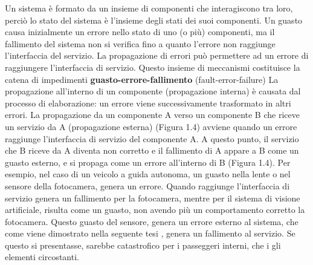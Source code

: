 \documentclass[14pt]{extarticle}
\begin{document}
Un sistema è formato da un insieme di componenti che interagiscono tra
loro, perciò lo stato del sistema è l'insieme degli stati dei suoi componenti. Un
guasto causa inizialmente un errore nello stato di uno (o più) componenti, ma
il fallimento del sistema non si verifica fino a quanto l'errore non raggiunge l'interfaccia del servizio. La propagazione di errori può permettere ad un errore
di raggiungere l'interfaccia di servizio. Questo insieme di meccanismi costituisce la catena di impedimenti \textbf{guasto-errore-fallimento} (fault-error-failure)
La propagazione all'interno di un componente (propagazione interna) è
causata dal processo di elaborazione: un errore viene successivamente trasformato in altri errori.
 La propagazione da un componente A verso un componente B che riceve un servizio da A (propagazione esterna) (Figura 1.4) avviene
quando un errore raggiunge l'interfaccia di servizio del componente A. A questo punto, il servizio che B riceve da A diventa non corretto e il fallimento di
A appare a B come un guasto esterno, e si propaga come un errore all’interno
di B (Figura 1.4). Per esempio, nel caso di un veicolo a guida autonoma, un guasto nella lente o nel sensore della fotocamera,  genera un errore. Quando raggiunge l'interfaccia di servizio genera un fallimento per la fotocamera, mentre per il sistema di visione artificiale, risulta come un guasto, non avendo più un comportamento corretto la fotocamera. Questo guasto del sensore, genera un errore esterno al sistema, che come viene dimostrato nella seguente tesi \cite{secci2020failures}, genera un fallimento al servizio. Se questo si presentasse, sarebbe catastrofico per i passeggeri interni, che i gli elementi circostanti.
\end{document}
